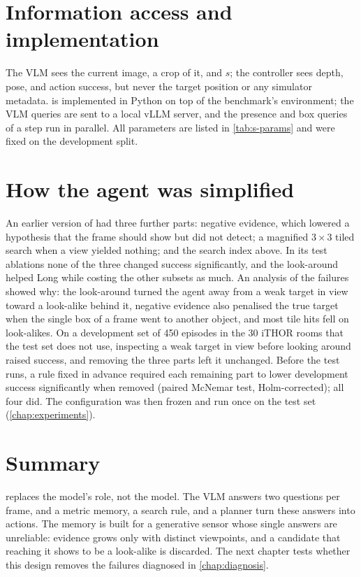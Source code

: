 \section{Information access and implementation}
\label{sec:method-impl}
The VLM sees the current image, a crop of it, and $s$; the controller sees depth, pose, and action success,
but never the target position or any simulator metadata. \ours is implemented in Python on top of the benchmark's
environment; the VLM queries are sent to a local vLLM server, and the presence and box queries of a step run in parallel. All parameters are listed in \cref{tab:s-params} and were fixed on the
development split.

\section{How the agent was simplified}
\label{sec:method-simplify}
An earlier version of \ours had three further parts: negative evidence, which lowered a hypothesis that the frame
should show but did not detect; a magnified $3{\times}3$ tiled search when a view yielded nothing; and the search index
above. In its test ablations none of the three changed success significantly, and the look-around helped Long while
costing the other subsets as much. An analysis of the failures showed why: the look-around turned the agent away from a
weak target in view toward a look-alike behind it, negative evidence also penalised the true target when the single
box of a frame went to another object, and most tile hits fell on look-alikes. On a development set of 450 episodes
in the 30 iTHOR rooms that the test set does not use, inspecting a weak target in view before looking around raised
success, and removing the three parts left it unchanged. Before the test runs, a rule fixed in advance required each
remaining part to lower development success significantly when removed (paired McNemar test, Holm-corrected); all four
did. The configuration was then frozen and run once on the test set (\cref{chap:experiments}).

\section{Summary}
\ours replaces the model's role, not the model. The VLM answers two questions per frame, and a metric memory, a
search rule, and a planner turn these answers into actions. The memory is built for a generative sensor whose single
answers are unreliable: evidence grows only with distinct viewpoints, and a candidate that reaching it shows to be a
look-alike is discarded. The next chapter tests whether this design removes the failures diagnosed in \cref{chap:diagnosis}.
